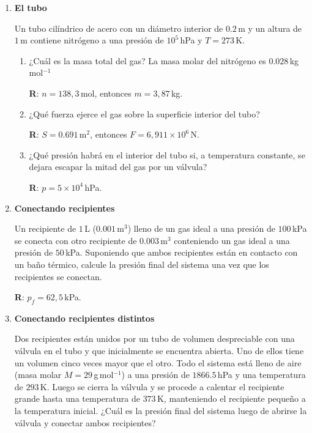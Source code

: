 \documentclass[a4paper,12pt]{article}
\begin{document}
\begin{enumerate}
\begin{enumerate}
				{\bf R}: $p=1690,4$\,hPa.
		\end{enumerate}
	
	\item {\bf{El tubo}}
		
		Un tubo cilíndrico de acero con un diámetro interior de $0.2$\,m y un
		altura de $1$\,m contiene nitrógeno a una presión de $10^5$\,hPa y
		$T=273$\,K.

		\begin{enumerate}
			\item ¿Cuál es la masa total del gas? La masa molar del nitrógeno
				es $0.028$\,kg\,mol$^{-1}$
				
				{\bf R}: $n=138,3$\,mol, entonces $m=3,87$\,kg.
			\item ¿Qué fuerza ejerce el gas sobre la superficie interior del tubo?
				
				{\bf R}: $S=0.691$\,m$^2$, entonces $F=6,911 \times 10^6$\,N.
			\item ¿Qué presión habrá en el interior del tubo si, a temperatura
				constante, se dejara escapar la mitad del gas por un válvula?
				
				{\bf R}: $p=5 \times 10^4$\,hPa.
		\end{enumerate}
 
	\item {\bf{Conectando recipientes}}

		Un recipiente de $1$\,L ($0.001$\,m$^3$) lleno de un gas ideal a una
		presión de $100$\,kPa se conecta con otro recipiente de $0.003$\,m$^3$
		conteniendo un gas ideal a una presión de $50$\,kPa. Suponiendo que
		ambos recipientes están en contacto con un baño térmico, calcule la
		presión final del sistema una vez que los recipientes se conectan.

		{\bf R}: $p_f = 62,5$\,kPa.
	\item {\bf{Conectando recipientes distintos}}
	
		Dos recipientes están unidos por un tubo de volumen despreciable con
		una válvula en el tubo y que inicialmente se encuentra abierta. Uno de
		ellos tiene un volumen cinco veces mayor que el otro. Todo el sistema
		está lleno de aire (masa molar $M=29$\,g\,mol$^{-1}$) a una presión de
		$1866.5$\,hPa y una temperatura de $293$\,K. Luego se cierra la válvula
		y se procede a calentar el recipiente grande hasta una temperatura de
		$373$\,K, manteniendo el recipiente pequeño a la temperatura inicial.
		¿Cuál es la presión final del sistema luego de abrirse la válvula y
		conectar ambos recipientes? 
	

\end{enumerate}
\end{document}
